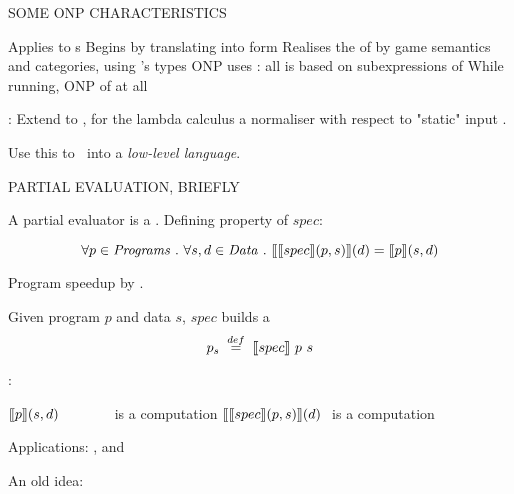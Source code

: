 \documentclass[12pt,fleqn,landscape]{article}
\begin{document}
\begin{slide}{SOME ONP CHARACTERISTICS}


\bi
\ii Applies to  {\lexp}s
\ii Begins by translating  into  form
\ii Realises the  of 
\ii {} by game semantics and categories, using 's types
\ii ONP uses : all is based on subexpressions of 
\ii While running, ONP  of  at all
\ei

\vair

:
\bi
\ii Extend  to , for the \textit{} lambda calculus
\ii {} a normaliser with respect to "static" input .

  Use this to  \lc $\ $ into a \textit{low-level language}.
\ei

\end{slide}



\begin{slide}{PARTIAL EVALUATION, BRIEFLY}

A partial evaluator is a . Defining property of $spec$:

$$
\forall p\in \mathit{Programs}\ .\ \forall s, d \in \mathit{Data}\ . \ 
\lsem \lsem spec\rsem (p, s)\rsem (d) = \lsem p\rsem (s, d)
$$


\bi
\ii Program speedup by .
\vair

\ii Given program $p$ and  data $s$, $spec$ builds a 
  $$p_s\;\stackrel{def}{=}\;\mbox{$\lbrack\hspace{-0.3ex}\lbrack$} spec \mbox{$\rbrack\hspace{-0.3ex}\rbrack$} \ p\ s$$

\ii {}:
\vair

  \bi
  \ii $\mbox{$\lbrack\hspace{-0.3ex}\lbrack$} p \mbox{$\rbrack\hspace{-0.3ex}\rbrack$} (s, d)\;\;\;\;\;\;\;\;\;\;\;\;\;$ is a  computation
  \ii $\mbox{$\lbrack\hspace{-0.3ex}\lbrack$} \mbox{$\lbrack\hspace{-0.3ex}\lbrack$} spec \mbox{$\rbrack\hspace{-0.3ex}\rbrack$} (p, s) \mbox{$\rbrack\hspace{-0.3ex}\rbrack$} (d)\ $ is a \red{2 stage} computation
  \ei

\vair

\ii Applications: , and 

  An old idea: 

\ei

\end{slide}
\end{document}
